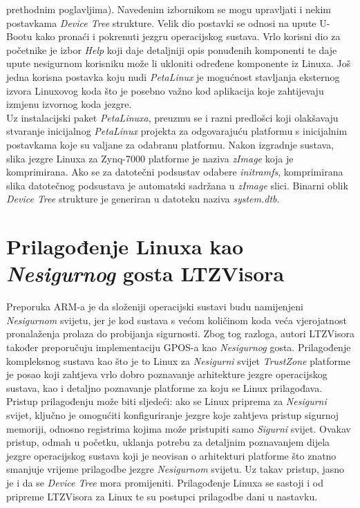 \documentclass[times, utf8, diplomski, numeric]{fer}
\begin{document}
prethodnim poglavljima). Navedenim izbornikom se mogu upravljati i nekim postavkama \textit{Device Tree} strukture. Velik dio
postavki se odnosi na upute U-Bootu kako pronaći i pokrenuti jezgru operacijskog sustava. Vrlo korisni dio za početnike je
izbor \textit{Help} koji daje detaljniji opis ponuđenih komponenti te daje upute nesigurnom korisniku može li ukloniti
određene komponente iz Linuxa. Još jedna korisna postavka koju nudi \textit{PetaLinux} je mogućnost stavljanja eksternog
izvora Linuxovog koda što je posebno važno kod aplikacija koje zahtijevaju izmjenu izvornog koda jezgre.\\
Uz instalacijski paket \textit{PetaLinuxa}, preuzmu se i razni predlošci koji olakšavaju stvaranje inicijalnog
\textit{PetaLinux} projekta za odgovarajuću platformu s inicijalnim postavkama koje su valjane za odabranu platformu. Nakon
izgradnje sustava, slika jezgre Linuxa za Zynq-7000 platforme je naziva \textit{zImage} koja je komprimirana. Ako se
za datotečni podsustav odabere \textit{initramfs}, komprimirana slika datotečnog podsustava je automatski sadržana u
\textit{zImage} slici. Binarni oblik \textit{Device Tree} strukture je generiran u datoteku naziva \textit{system.dtb}.

\section{Prilagođenje Linuxa kao \textit{Nesigurnog} gosta LTZVisora}
Preporuka ARM-a je da složeniji operacijski sustavi budu namijenjeni \textit{Nesigurnom} svijetu, jer je kod sustava s većom
količinom koda veća vjerojatnost pronalaženja prolaza do probijanja sigurnosti. Zbog tog razloga, autori LTZVisora također
preporučuju implementaciju GPOS-a kao \textit{Nesigurnog} gosta. Prilagođenje kompleksnog sustava kao što je to Linux za \textit{Nesigurni}
svijet \textit{TrustZone} platforme je posao koji zahtjeva vrlo dobro poznavanje arhitekture jezgre operacijskog sustava, kao
i detaljno poznavanje platforme za koju se Linux prilagođava. Pristup prilagođenju može biti sljedeći: ako se Linux priprema
za \textit{Nesigurni} svijet, ključno je omogućiti konfiguriranje jezgre koje zahtjeva pristup sigurnoj memoriji, odnosno registrima
kojima može pristupiti samo \textit{Sigurni} svijet. Ovakav pristup, odmah u početku, uklanja potrebu za detaljnim poznavanjem
dijela jezgre operacijskog sustava koji je neovisan o arhitekturi platforme što znatno smanjuje vrijeme prilagodbe jezgre
\textit{Nesigurnom} svijetu. Uz takav pristup, jasno je i da se \textit{Device Tree} mora promijeniti. Prilagođenje Linuxa se sastoji
i od pripreme LTZVisora za Linux te su postupci prilagodbe dani u nastavku.
\end{document}
